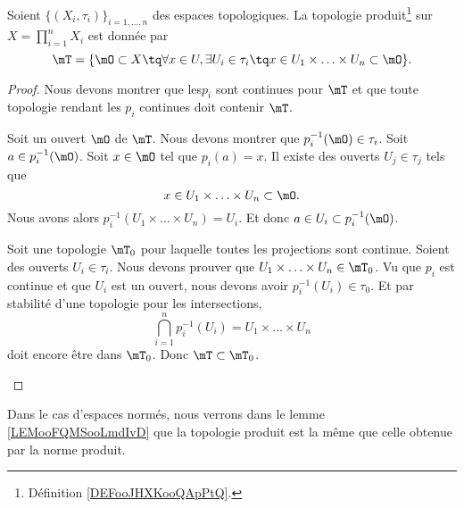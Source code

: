 \begin{proposition}      \label{DefIINHooAAjTdY}
	Soient \( \{ (X_i,\tau_i) \}_{i=1,\ldots, n}\) des espaces topologiques. La topologie produit\footnote{Définition \ref{DEFooJHXKooQApPtQ}.} sur \( X=\prod_{i=1}^nX_i\) est donnée par
	\begin{equation}		\label{EQooVECGooKLUkTy}
		\mT=\{ \mO\subset X\tq \forall x\in U,\exists U_i\in\tau_i\tq x\in U_1\times\ldots\times U_n\subset \mO \}.
	\end{equation}
\end{proposition}

\begin{proof}
	Nous devons montrer que les\( p_i\) sont continues pour \( \mT\) et que toute topologie rendant les \( p_i\) continues doit contenir \( \mT\).
	\begin{subproof}
		Soit un ouvert \( \mO\) de \( \mT\). Nous devons montrer que \( p_i^{-1}(\mO)\in \tau_i\). Soit \( a\in p_i^{-1}(\mO)\). Soit \( x\in\mO\) tel que \( p_i(a)=x\). Il existe des ouverts \( U_j\in\tau_j\) tels que
		\begin{equation}
			x\in U_1\times \ldots\times U_n\subset\mO.
		\end{equation}
		Nous avons alors \( p_i^{-1}(U_1\times \ldots\times U_n)=U_i\). Et donc \( a\in U_i\subset p_i^{-1}(\mO)\).

		Soit une topologie \( \mT_0\) pour laquelle toutes les projections sont continue. Soient des ouverts \( U_i\in \tau_i\). Nous devons prouver que \( U_1\times\ldots\times U_n\in\mT_0\). Vu que \( p_i\) est continue et que \( U_i\) est un ouvert, nous devons avoir \( p_i^{-1}(U_i)\in \tau_0\). Et par stabilité d'une topologie pour les intersections,
		\begin{equation}
			\bigcap_{i=1}^np_i^{-1}(U_i)=U_1\times\ldots\times U_n
		\end{equation}
		doit encore être dans \( \mT_0\). Donc \( \mT\subset\mT_0\).
	\end{subproof}
\end{proof}


Dans le cas d'espaces normés, nous verrons dans le lemme \ref{LEMooFQMSooLmdIvD} que la topologie produit est la même que celle obtenue par la norme produit.

